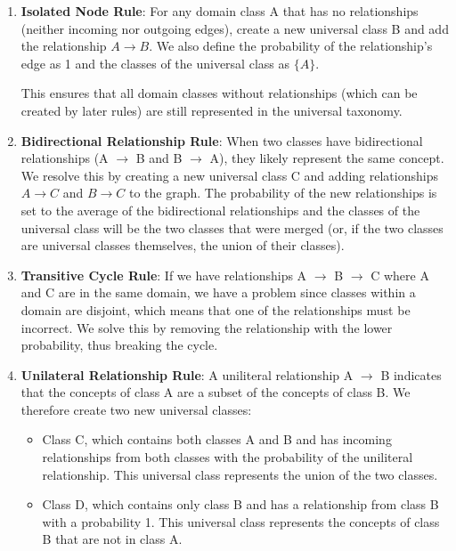 \begin{enumerate}
      \item \textbf{Isolated Node Rule}: For any domain class A that has no relationships
            (neither incoming nor outgoing edges), create a new universal class B
            and add the relationship $A \rightarrow B$.
            We also define the probability of the relationship's edge as 1 and
            the classes of the universal class as $\{A\}$.

            This ensures that all domain classes without relationships (which can be created by later rules)
            are still represented in the universal taxonomy.

      \item \textbf{Bidirectional Relationship Rule}: When two classes have bidirectional relationships
            (A $\rightarrow$ B and B $\rightarrow$ A), they likely represent the same concept.
            We resolve this by creating a new universal class C and adding relationships
            $A \rightarrow C$ and $B \rightarrow C$ to the graph.
            The probability of the new relationships is set to the average of the bidirectional relationships and the classes of the universal class
            will be the two classes that were merged (or, if the two classes are universal classes themselves,
            the union of their classes).

      \item \textbf{Transitive Cycle Rule}: If we have relationships A $\rightarrow$ B $\rightarrow$ C
            where A and C are in the same domain, we have a problem since classes within a domain
            are disjoint, which means that one of the relationships must be incorrect.
            We solve this by removing the relationship with the lower probability,
            thus breaking the cycle.

      \item \textbf{Unilateral Relationship Rule}: A uniliteral relationship
            A $\rightarrow$ B indicates that the concepts of class A are a subset of the concepts of class B.
            We therefore create two new universal classes:
            \begin{itemize}
                  \item Class C, which contains both classes A and B and has incoming relationships
                        from both classes with the probability of the uniliteral relationship.
                        This universal class represents the union of the two classes.
                  \item Class D, which contains only class B and has a relationship from class B with a probability 1.
                        This universal class represents the concepts of class B that are not in class A.
            \end{itemize}
\end{enumerate}


